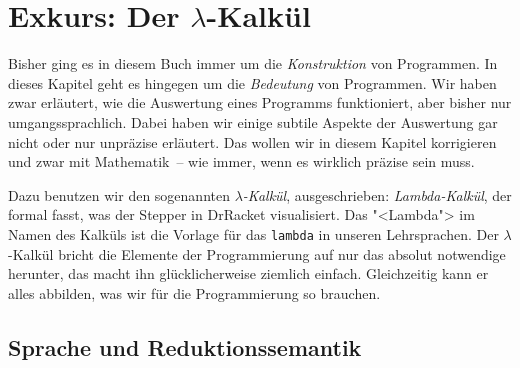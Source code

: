 
\chapter{Exkurs: Der $\lambda$-Kalkül}
\label{chap:lambda}


Bisher ging es in diesem Buch immer um die \emph{Konstruktion} von
Programmen.  In dieses Kapitel geht es hingegen um die
\textit{Bedeutung} von Programmen.  Wir haben zwar erläutert, wie die
Auswertung eines Programms funktioniert, aber bisher nur
umgangssprachlich.  Dabei haben wir einige subtile Aspekte der
Auswertung gar nicht oder nur unpräzise erläutert.  Das wollen wir in
diesem Kapitel korrigieren und zwar mit Mathematik~-- wie immer, wenn
es wirklich präzise sein muss.

Dazu benutzen wir den sogenannten \textit{$\lambda$-Kalkül},
ausgeschrieben: \textit{Lambda-Kalkül}, der formal fasst, was der
Stepper in DrRacket visualisiert.  Das "<Lambda"> im Namen des Kalküls
ist die Vorlage für das \lstinline{lambda} in unseren Lehrsprachen.
Der $\lambda$-Kalkül bricht die Elemente der Programmierung auf nur
das absolut notwendige herunter, das macht ihn glücklicherweise
ziemlich einfach.  Gleichzeitig kann er alles abbilden, was wir für
die Programmierung so brauchen.

\section{Sprache und Reduktionssemantik}
\label{sec:sprache}

